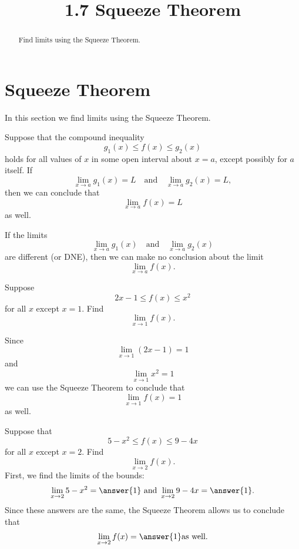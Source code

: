 \documentclass{ximera}
\title{1.7 Squeeze Theorem}
\begin{document}
\begin{abstract}
Find limits using the Squeeze Theorem.
\end{abstract}

\maketitle

\section{Squeeze Theorem}
 

In this section we find limits using the Squeeze Theorem.

\begin{theorem} 
Suppose that the compound inequality
\[
g_1(x) \leq f(x) \leq g_2(x)
\]
holds for all values of $x$ in some open interval about $x=a$, except possibly for $a$ itself.
If
\[
\lim_{x\to a} g_1(x) = L \quad \text{and} \quad \lim_{x\to a} g_2(x) = L,
\]
then we can conclude that
\[
\lim_{x\to a} f(x) = L
\]
as well.

\end{theorem}


\begin{remark}
If the limits
\[
\lim_{x\to a} g_1(x)  \quad \text{and} \quad \lim_{x\to a} g_2(x)
\]
are different (or DNE), then we can make no conclusion about the limit
\[
\lim_{x\to a} f(x).
\]
\end{remark}

\begin{example}
Suppose 
\[
 2x-1 \leq f(x) \leq x^2
\]
for all $x$ except $x=1$.
Find
\[
\lim_{x\to 1} f(x).
\]

Since
\[
\lim_{x\to 1} (2x-1) = 1
\]
and
\[
\lim_{x\to 1} x^2 = 1
\]
we can use the Squeeze Theorem to conclude that
\[
\lim_{x\to 1} f(x) = 1
\]
as well.

\end{example}

\begin{problem}
Suppose that 
\[
 5-x^2\leq f(x) \leq 9-4x
\]
for all $x$ except $x=2$.
Find
\[
\lim_{x\to 2} f(x).
\]
First, we find the limits of the bounds:
\[
\lim_{x \to 2} 5 - x^2 = \answer{1} \text{ and } \lim_{x \to 2} 9-4x = \answer{1}.
\]
Since these answers are the same, the Squeeze Theorem allows us to conclude that 
\[
\lim_{x \to 2} f(x) = \answer{1} \text{as well}.
\]

\end{problem}
\end{document}
